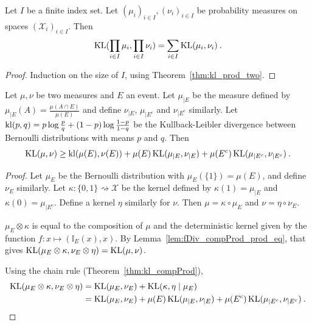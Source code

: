 \begin{theorem}
  \label{thm:kl_pi}
  \leanok
  Let $I$ be a finite index set. Let $(\mu_i)_{i \in I}, (\nu_i)_{i \in I}$ be probability measures on spaces $(\mathcal X_i)_{i \in I}$. Then
  \begin{align*}
  \operatorname{KL}(\prod_{i \in I} \mu_i, \prod_{i \in I} \nu_i) = \sum_{i \in I} \operatorname{KL}(\mu_i, \nu_i)
  \: .
  \end{align*}
\end{theorem}

\begin{proof} \leanok
{}
Induction on the size of $I$, using Theorem~\ref{thm:kl_prod_two}.
\end{proof}


\begin{lemma}
  \label{lem:kl_chain_rule_cond_event}
  Let $\mu, \nu$ be two measures and $E$ an event. Let $\mu_{|E}$ be the measure defined by $\mu_{|E}(A) = \frac{\mu(A \cap E)}{\mu(E)}$ and define $\nu_{|E}$, $\mu_{| E^c}$ and $\nu_{| E^c}$ similarly. Let $\operatorname{kl}(p,q) = p\log\frac{p}{q} + (1-p)\log\frac{1-p}{1-q}$ be the Kullback-Leibler divergence between Bernoulli distributions with means $p$ and $q$. Then
  \begin{align*}
  \operatorname{KL}(\mu, \nu) \ge \operatorname{kl}(\mu(E), \nu(E)) + \mu(E) \operatorname{KL}(\mu_{|E}, \nu_{|E}) + \mu(E^c) \operatorname{KL}(\mu_{|E^c}, \nu_{|E^c}) \: .
  \end{align*}
\end{lemma}

\begin{proof}
Let $\mu_E$ be the Bernoulli distribution with $\mu_E(\{1\}) = \mu(E)$, and define $\nu_E$ similarly.
Let $\kappa : \{0,1\} \rightsquigarrow \mathcal X$ be the kernel defined by $\kappa(1) = \mu_{|E}$ and $\kappa(0) = \mu_{|E^c}$. Define a kernel $\eta$ similarly for $\nu$.
Then $\mu = \kappa \circ \mu_E$ and $\nu = \eta \circ \nu_E$.

$\mu_E \otimes \kappa$ is equal to the composition of $\mu$ and the deterministic kernel given by the function $f : x \mapsto (\mathbb{I}_E(x), x)$. By Lemma~\ref{lem:fDiv_compProd_prod_eq}, that gives $\operatorname{KL}(\mu_E \otimes \kappa, \nu_E \otimes \eta) = \operatorname{KL}(\mu, \nu)$.

Using the chain rule (Theorem~\ref{thm:kl_compProd}),
\begin{align*}
\operatorname{KL}(\mu_E \otimes \kappa, \nu_E \otimes \eta)
&= \operatorname{KL}(\mu_E, \nu_E) + \operatorname{KL}(\kappa, \eta \mid \mu_E)
\\
&= \operatorname{KL}(\mu_E, \nu_E) + \mu(E) \operatorname{KL}(\mu_{|E}, \nu_{|E}) + \mu(E^c) \operatorname{KL}(\mu_{|E^c}, \nu_{|E^c})
\: .
\end{align*}

\end{proof}


